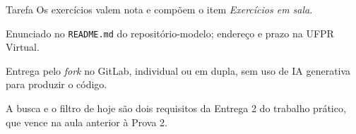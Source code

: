 \documentclass{beamer}
\begin{document}
\begin{frame}{Tarefa}
	Os exercícios valem nota e compõem o item \emph{Exercícios em sala}.

	\vspace{0.3cm}
	Enunciado no \texttt{README.md} do repositório-modelo; endereço e prazo na
	UFPR Virtual.

	\vspace{0.3cm}
	Entrega pelo \emph{fork} no GitLab, individual ou em dupla, sem uso de IA
	generativa para produzir o código.

	\vspace{0.5cm}
	A busca e o filtro de hoje são dois requisitos da Entrega 2 do trabalho
	prático, que vence na aula anterior à Prova 2.
\end{frame}
\end{document}
